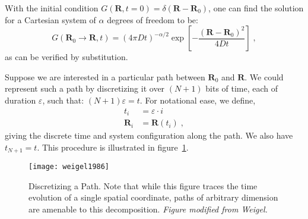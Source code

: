 \documentclass[letterpaper]{tufte-handout}
\renewcommand{\vec}[1]{\mathbf{#1}}
\begin{document}
With the initial condition $G(\vec{R}, t = 0) = \delta(\vec{R}- \vec{R}_{0})$, one can find the solution for a Cartesian system of $\alpha$ degrees of freedom to be:
\begin{equation} \label{eqn:gSoln}
G(\vec{R}_{0} \rightarrow \vec{R} , t) = {(4\pi D t)}^{-\alpha/2}\exp\left[ -\frac{{(\vec{R} - \vec{R}_0)}^2}{4Dt}\right] \; ,
\end{equation}
as can be verified by substitution.

\pagebreak

Suppose we are interested in  a particular path between $\vec{R}_0$ and $\vec{R}$. We could represent such a path by discretizing it over $(N+1)$ bits of time, each of duration $\varepsilon$, such that: $(N+1)\varepsilon=t$. For notational ease, we define,
\begin{align*}
  t_{i}   &= \varepsilon \cdot i\\
  \vec{R}_{i} &= \vec{R}\left( t_i \right) \; ,
\end{align*}
  giving the discrete time and system configuration along the path. We also have $t_{N+1} = t$. This procedure is illustrated in figure~\ref{fig:path}.

\begin{figure}
  \texttt{[image: weigel1986]}
  \caption{\label{fig:path} Discretizing a Path. Note that while this figure traces the time evolution of a single spatial coordinate, paths of arbitrary dimension are amenable to this decomposition. \emph{Figure modified from Weigel.}}
\end{figure}
\end{document}

